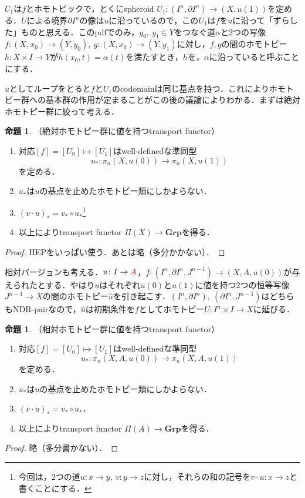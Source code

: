 \documentclass[a4paper,11pt]{jsarticle}
\theoremstyle{definition}
\newtheorem{prop}[thm]{命題}
\begin{document}
$U_1$は$f$とホモトピックで，とくにspheroid $U_1\colon (I^n,\partial I^n)\to (X,u(1))$を定める．$U$による境界$\partial I^n$の像は$u$に沿っているので，この$U_1$は$f$を$u$に沿って「ずらした」ものと思える．このpdfでのみ，$y_0,\ y_1\in Y$をつなぐ道$\alpha$と2つの写像$f\colon (X,x_0)\to (Y,y_0),\ g\colon (X,x_0)\to (Y,y_1)$に対し，$f,g$の間のホモトピー$h\colon X\times I\to Y$が$h(x_0,t)=\alpha(t)$を満たすとき，$h$を，$\alpha$に沿っていると呼ぶことにする．

$u$としてループをとると$f$と$U_1$のcodomainは同じ基点を持つ．これによりホモトピー群への基本群の作用が定まることがこの後の議論によりわかる．まずは絶対ホモトピー群に絞って考える．
\begin{prop}（絶対ホモトピー群に値を持つtransport functor）
  \begin{enumerate}[(1)]
    \item 対応$[f]=[U_0]\mapsto[U_1]$はwell-definedな準同型
    \[
      u_*\colon \pi_n(X,u(0))\to \pi_n(X,u(1))
    \]
    を定める．
    \item $u_*$は$u$の基点を止めたホモトピー類にしかよらない．
    \item $(v\cdot u)_*=v_*\circ u_*$\footnote{今回は，2つの道$u\colon x\to y,\ v\colon y\to z$に対し，それらの和の記号を$v\cdot u\colon x\to z$と書くことにする．}
    \item 以上によりtransport functor $\Pi(X)\to \mathbf{Grp}$を得る．
  \end{enumerate}
\end{prop}
\begin{proof}
  HEPをいっぱい使う．あとは略（多分かかない）．
\end{proof}

相対バージョンも考える．$u\colon I\to {\color{red}A}$，$f\colon (I^n,\partial I^n,J^{n-1})\to (X,A,u(0))$が与えられたとする．やはり$u$はそれぞれ$u(0)$と$u(1)$に値を持つ2つの恒等写像$J^{n-1}\to X$の間のホモトピー$\hat u$を引き起こす．$(I^n,\partial I^n),\ (\partial I^n,J^{n-1})$はどちらもNDR-pairなので，$\hat u$は初期条件を$f$としてホモトピー$U\colon I^n \times I\to X$に延びる．

\begin{prop}（相対ホモトピー群に値を持つtransport functor）
  \begin{enumerate}[(1)]
    \item 対応$[f]=[U_0]\mapsto[U_1]$はwell-definedな準同型
    \[
      u_*\colon \pi_n(X,A,u(0))\to \pi_n(X,A,u(1))
    \]
    を定める．
    \item $u_*$は$u$の基点を止めたホモトピー類にしかよらない．
    \item $(v\cdot u)_*=v_*\circ u_*$．
    \item 以上によりtransport functor $\Pi(A)\to \mathbf{Grp}$を得る．
  \end{enumerate}
\end{prop}
\begin{proof}
  略（多分書かない）．
\end{proof}
\end{document}
